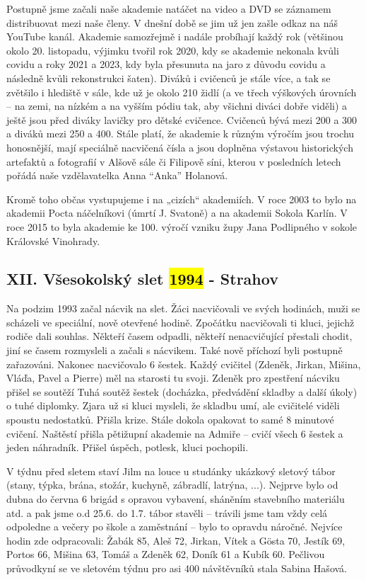 Postupně jsme začali naše akademie natáčet na video a DVD se záznamem
distribuovat mezi naše členy. V dnešní době se jim už jen zašle odkaz na
náš YouTube kanál. Akademie samozřejmě i nadále probíhají každý rok
(většinou okolo 20. listopadu, výjimku tvořil rok 2020, kdy se akademie
nekonala kvůli covidu a roky 2021 a 2023, kdy byla přesunuta na jaro z
důvodu covidu a následně kvůli rekonstrukci šaten). Diváků i cvičenců je
stále více, a tak se zvětšilo i hlediště v sále, kde už je okolo 210
židlí (a ve třech výškových úrovních -- na zemi, na nízkém a na vyšším
pódiu tak, aby všichni diváci dobře viděli) a ještě jsou před diváky
lavičky pro dětské cvičence. Cvičenců bývá mezi 200 a 300 a diváků mezi
250 a 400. Stále platí, že akademie k různým výročím jsou trochu
honosnější, mají speciálně nacvičená čísla a jsou doplněna výstavou
historických artefaktů a fotografií v Alšově sále či Filipově síni,
kterou v posledních letech pořádá naše vzdělavatelka Anna ``Anka''
Holanová.

Kromě toho občas vystupujeme i na „cizích`` akademiích. V roce 2003 to
bylo na akademii Pocta náčelníkovi (úmrtí J. Svatoně) a na akademii
Sokola Karlín. V roce 2015 to byla akademie ke 100. výročí vzniku župy
Jana Podlipného v sokole Královské Vinohrady.

\subsection{\texorpdfstring{XII. Všesokolský slet \hl{1994} -
Strahov}{XII. Všesokolský slet 1994 - Strahov}}\label{xii.-vux161esokolskuxfd-slet-1994---strahov}

Na podzim 1993 začal nácvik na slet. Žáci nacvičovali ve svých hodinách,
muži se scházeli ve speciální, nově otevřené hodině. Zpočátku
nacvičovali ti kluci, jejichž rodiče dali souhlas. Někteří časem
odpadli, někteří nenacvičující přestali chodit, jiní se časem rozmysleli
a začali s nácvikem. Také nově příchozí byli postupně zařazováni.
Nakonec nacvičovalo 6 šestek. Každý cvičitel (Zdeněk, Jirkan, Mišina,
Vláďa, Pavel a Pierre) měl na starosti tu svoji. Zdeněk pro zpestření
nácviku přišel se soutěží Tuhá soutěž šestek (docházka, předvádění
skladby a další úkoly) o tuhé diplomky. Zjara už si kluci mysleli, že
skladbu umí, ale cvičitelé viděli spoustu nedostatků. Přišla krize.
Stále dokola opakovat to samé 8 minutové cvičení. Naštěstí přišla
pětižupní akademie na Admiře -- cvičí všech 6 šestek a jeden náhradník.
Přišel úspěch, potlesk, kluci pochopili.

V týdnu před sletem staví Jilm na louce u studánky ukázkový sletový
tábor (stany, týpka, brána, stožár, kuchyně, zábradlí, latrýna, ...).
Nejprve bylo od dubna do června 6 brigád s opravou vybavení, sháněním
stavebního materiálu atd. a pak jsme o.d 25.6. do 1.7. tábor stavěli --
trávili jsme tam vždy celá odpoledne a večery po škole a zaměstnání --
bylo to opravdu náročné. Nejvíce hodin zde odpracovali: Žabák 85, Aleš
72, Jirkan, Vítek a Gösta 70, Jestík 69, Portos 66, Mišina 63, Tomáš a
Zdeněk 62, Doník 61 a Kubík 60. Pečlivou průvodkyní se ve sletovém týdnu
pro asi 400 návštěvníků stala Sabina Hašová.

